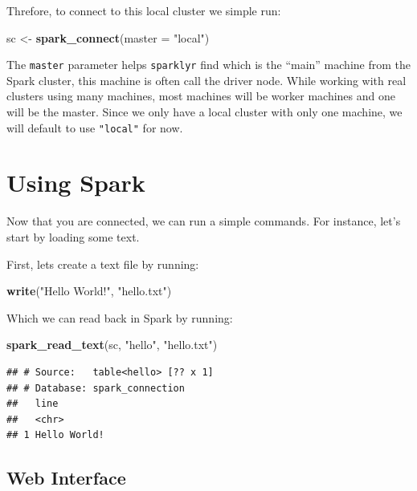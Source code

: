 \documentclass[]{book}
\newenvironment{Shaded}{\begin{snugshade}}{\end{snugshade}}
\newcommand{\DataTypeTok}[1]{\textcolor[rgb]{0.13,0.29,0.53}{#1}}
\newcommand{\KeywordTok}[1]{\textcolor[rgb]{0.13,0.29,0.53}{\textbf{#1}}}
\newcommand{\NormalTok}[1]{#1}
\newcommand{\StringTok}[1]{\textcolor[rgb]{0.31,0.60,0.02}{#1}}
\theoremstyle{definition}
\theoremstyle{definition}
\theoremstyle{definition}
\theoremstyle{remark}
\begin{document}
Threfore, to connect to this local cluster we simple run:

\begin{Shaded}
\begin{Highlighting}[]
\NormalTok{sc <-}\StringTok{ }\KeywordTok{spark_connect}\NormalTok{(}\DataTypeTok{master =} \StringTok{"local"}\NormalTok{)}
\end{Highlighting}
\end{Shaded}

The \texttt{master} parameter helps \texttt{sparklyr} find which is the
``main'' machine from the Spark cluster, this machine is often call the
driver node. While working with real clusters using many machines, most
machines will be worker machines and one will be the master. Since we
only have a local cluster with only one machine, we will default to use
\texttt{"local"} for now.

\hypertarget{using-spark}{%
\section{Using Spark}\label{using-spark}}

Now that you are connected, we can run a simple commands. For instance,
let's start by loading some text.

First, lets create a text file by running:

\begin{Shaded}
\begin{Highlighting}[]
\KeywordTok{write}\NormalTok{(}\StringTok{"Hello World!"}\NormalTok{, }\StringTok{"hello.txt"}\NormalTok{)}
\end{Highlighting}
\end{Shaded}

Which we can read back in Spark by running:

\begin{Shaded}
\begin{Highlighting}[]
\KeywordTok{spark_read_text}\NormalTok{(sc, }\StringTok{"hello"}\NormalTok{, }\StringTok{"hello.txt"}\NormalTok{)}
\end{Highlighting}
\end{Shaded}

\begin{verbatim}
## # Source:   table<hello> [?? x 1]
## # Database: spark_connection
##   line        
##   <chr>       
## 1 Hello World!
\end{verbatim}

\hypertarget{web-interface}{%
\subsection{Web Interface}\label{web-interface}}
\end{document}
